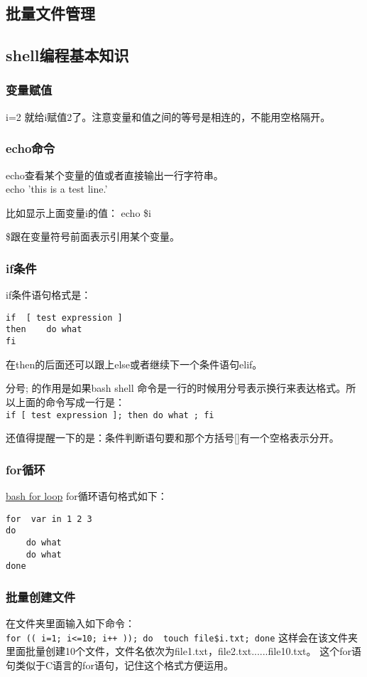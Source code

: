 \documentclass[11pt,oneside]{book}
\begin{document}
\begin{common-format}
\mainmatter

\chapter{批量文件管理}

\section{shell编程基本知识}
\subsection{变量赋值}
i=2
就给i赋值2了。注意变量和值之间的等号是相连的，不能用空格隔开。

\subsection{echo命令}
echo查看某个变量的值或者直接输出一行字符串。\\
echo 'this is a test line.'

比如显示上面变量i的值：
echo \${}i

\${}跟在变量符号前面表示引用某个变量。

\subsection{if条件}
if条件语句格式是：
\begin{verbatim}
if  [ test expression ]
then    do what
fi  
\end{verbatim}
在then的后面还可以跟上else或者继续下一个条件语句elif。

分号; 的作用是如果bash shell 命令是一行的时候用分号表示换行来表达格式。所以上面的命令写成一行是：\\
\verb+if [ test expression ]; then do what ; fi+

还值得提醒一下的是：条件判断语句要和那个方括号[]有一个空格表示分开。

\subsection{for循环}
\href{http://www.cyberciti.biz/faq/bash-for-loop/}{bash for loop}
for循环语句格式如下：
\begin{verbatim}
for  var in 1 2 3
do 
    do what
    do what
done
\end{verbatim}

\subsection{批量创建文件}
在文件夹里面输入如下命令：\\
\verb|for (( i=1; i<=10; i++ )); do  touch file$i.txt; done|
这样会在该文件夹里面批量创建10个文件，文件名依次为file1.txt，file2.txt......file10.txt。
这个for语句类似于C语言的for语句，记住这个格式方便运用。



\end{common-format}
\end{document}
